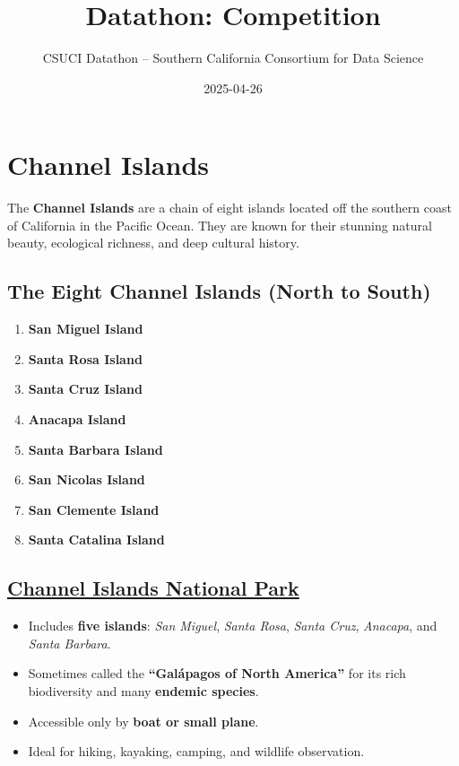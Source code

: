 \documentclass[
  letterpaper,
]{report}
\title{Datathon: Competition}
\author{CSUCI Datathon -- Southern California Consortium for Data
Science}
\date{2025-04-26}
\providecommand{\tightlist}{%
  \setlength{\itemsep}{0pt}\setlength{\parskip}{0pt}}\usepackage{longtable,booktabs,array}
\begin{document}
\maketitle


\section{Channel Islands}\label{channel-islands}

The \textbf{Channel Islands} are a chain of eight islands located off
the southern coast of California in the Pacific Ocean. They are known
for their stunning natural beauty, ecological richness, and deep
cultural history.

\subsection{The Eight Channel Islands (North to
South)}\label{the-eight-channel-islands-north-to-south}

\begin{enumerate}
\def\labelenumi{\arabic{enumi}.}
\item
  \textbf{San Miguel Island}
\item
  \textbf{Santa Rosa Island}
\item
  \textbf{Santa Cruz Island}
\item
  \textbf{Anacapa Island}
\item
  \textbf{Santa Barbara Island}
\item
  \textbf{San Nicolas Island}
\item
  \textbf{San Clemente Island}
\item
  \textbf{Santa Catalina Island}
\end{enumerate}

\subsection{\texorpdfstring{\href{https://www.nps.gov/chis/index.htm}{Channel
Islands National
Park}}{Channel Islands National Park}}\label{channel-islands-national-park}

\begin{itemize}
\tightlist
\item
  Includes \textbf{five islands}: \emph{San Miguel}, \emph{Santa Rosa},
  \emph{Santa Cruz}, \emph{Anacapa}, and \emph{Santa Barbara}.
\item
  Sometimes called the \textbf{``Galápagos of North America''} for its
  rich biodiversity and many \textbf{endemic species}.
\item
  Accessible only by \textbf{boat or small plane}.
\item
  Ideal for hiking, kayaking, camping, and wildlife observation.
\end{itemize}
\end{document}
